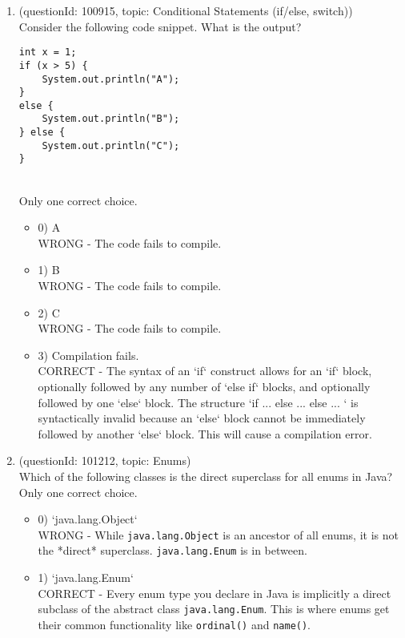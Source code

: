 \documentclass[12pt]{article}
\begin{document}
\begin{enumerate}[label=(\arabic*)]
\begin{itemize}
\end{itemize}
\item (questionId: 100915, topic: Conditional Statements (if/else, switch)) \\ 
Consider the following code snippet. What is the output?\n\begin{verbatim}
int x = 1;
if (x > 5) {
    System.out.println("A");
}
else {
    System.out.println("B");
} else {
    System.out.println("C");
}
\end{verbatim}
\\ \noindent Only one correct choice. 
\begin{itemize}
\item 0) A
 \\ 
WRONG - The code fails to compile.

\item 1) B
 \\ 
WRONG - The code fails to compile.

\item 2) C
 \\ 
WRONG - The code fails to compile.

\item 3) Compilation fails.
 \\ 
CORRECT - The syntax of an `if` construct allows for an `if` block, optionally followed by any number of `else if` blocks, and optionally followed by one `else` block. The structure `if { ... } else { ... } else { ... }` is syntactically invalid because an `else` block cannot be immediately followed by another `else` block. This will cause a compilation error.

\end{itemize}
\item (questionId: 101212, topic: Enums) \\ 
Which of the following classes is the direct superclass for all enums in Java?
\\ \noindent Only one correct choice. 
\begin{itemize}
\item 0) `java.lang.Object`
 \\ 
WRONG - While \verb|java.lang.Object| is an ancestor of all enums, it is not the *direct* superclass. \verb|java.lang.Enum| is in between.

\item 1) `java.lang.Enum`
 \\ 
CORRECT - Every enum type you declare in Java is implicitly a direct subclass of the abstract class \verb|java.lang.Enum|. This is where enums get their common functionality like \verb|ordinal()| and \verb|name()|.


\end{itemize}
\end{enumerate}
\end{document}
